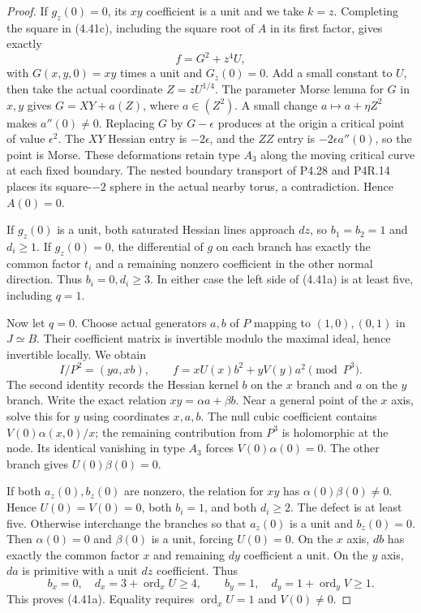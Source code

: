 \begin{proof}
If $g_z(0)=0$, its $xy$ coefficient is a unit and we take
$k=z$. Completing the square in (4.41c), including the
square root of $A$ in its first factor, gives exactly
\[
                         f=G^2+z^4U,
\]
with $G(x,y,0)=xy$ times a unit and $G_z(0)=0$.
Add a small constant to $U$, then take the actual coordinate
$Z=zU^{1/4}$. The parameter Morse lemma for $G$ in $x,y$
gives $G=XY+a(Z)$, where $a\in(Z^2)$. A small change
$a\mapsto a+\eta Z^2$ makes $a''(0)\ne0$. Replacing
$G$ by $G-\epsilon$ produces at the origin a critical point
of value $\epsilon^2$. The $XY$ Hessian entry is
$-2\epsilon$, and the $ZZ$ entry is
$-2\epsilon a''(0)$, so the point is Morse.
These deformations retain type $A_3$ along the moving
critical curve at each fixed boundary. The nested boundary
transport of P4.28 and P4R.14 places its square-$-2$ sphere
in the actual nearby torus, a contradiction. Hence $A(0)=0$.

If $g_z(0)$ is a unit, both saturated Hessian lines approach
$dz$, so $b_1=b_2=1$ and $d_i\ge1$. If $g_z(0)=0$,
the differential of $g$ on each branch has exactly the
common factor $t_i$ and a remaining nonzero coefficient
in the other normal direction. Thus $b_i=0,d_i\ge3$.
In either case the left side of (4.41a) is at least five,
including $q=1$.

Now let $q=0$. Choose actual generators $a,b$ of $P$ mapping
to $(1,0),(0,1)$ in $J\simeq B$. Their coefficient matrix
is invertible modulo the maximal ideal, hence invertible
locally. We obtain
\[
 I/P^2=(ya,xb),\qquad
 f=xU(x)b^2+yV(y)a^2\pmod {P^3}.                      \tag{4.41d}
\]
The second identity records the Hessian kernel $b$ on the
$x$ branch and $a$ on the $y$ branch. Write the exact
relation $xy=\alpha a+\beta b$. Near a general point of
the $x$ axis, solve this for $y$ using coordinates $x,a,b$.
The null cubic coefficient contains
$V(0)\alpha(x,0)/x$; the remaining contribution from
$P^3$ is holomorphic at the node. Its identical vanishing
in type $A_3$ forces $V(0)\alpha(0)=0$. The other branch
gives $U(0)\beta(0)=0$.

If both $a_z(0),b_z(0)$ are nonzero, the relation for $xy$
has $\alpha(0)\beta(0)\ne0$. Hence $U(0)=V(0)=0$,
both $b_i=1$, and both $d_i\ge2$. The defect is at least
five. Otherwise interchange the branches so that $a_z(0)$
is a unit and $b_z(0)=0$. Then $\alpha(0)=0$ and
$\beta(0)$ is a unit, forcing $U(0)=0$. On the $x$ axis,
$db$ has exactly the common factor $x$ and remaining
$dy$ coefficient a unit. On the $y$ axis, $da$ is primitive
with a unit $dz$ coefficient. Thus
\[
 b_x=0,\quad d_x=3+\operatorname{ord}_xU\ge4,
 \qquad
 b_y=1,\quad d_y=1+\operatorname{ord}_yV\ge1.
\]
This proves (4.41a). Equality requires
$\operatorname{ord}_xU=1$ and $V(0)\ne0$.


\end{proof}
